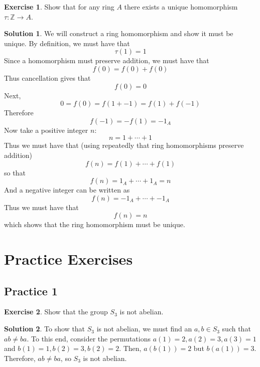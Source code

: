\documentclass[12pt]{article}
\theoremstyle{definition}
\newcommand{\Z}{\mathbb{Z}}
\newtheorem{exercise}{\color{YellowOrange}Exercise}
\theoremstyle{definition}
\newtheorem{solution}{\color{Goldenrod}Solution}
\begin{document}
\begin{exercise}
	Show that for any ring $A$ there exists a unique homomorphism $\tau : \Z \to A$. 
\end{exercise}
\begin{solution}
	We will construct a ring homomorphism and show it must be unique. By definition, we must have that
	\begin{equation}
		\tau(1) = 1
	\end{equation}
	Since a homomorphism must preserve addition, we must have that
	\begin{equation}
		f(0) = f(0) + f(0)
	\end{equation}
	Thus cancellation gives that
	\begin{equation}
		f(0) = 0
	\end{equation}
	Next,
	\begin{equation}
		0 = f(0) = f(1 + -1) = f(1) + f(-1)
	\end{equation}
	Therefore
	\begin{equation}
		f(-1) = -f(1) = -1_A
	\end{equation}
	Now take a positive integer $n$:
	\begin{equation}
		n = 1 + \cdots + 1
	\end{equation}
	Thus we must have that (using repeatedly that ring homomorphisms preserve addition)
	\begin{equation}
		f(n) = f(1) + \cdots + f(1)
	\end{equation}
	so that
	\begin{equation}
		f(n) = 1_A + \cdots + 1_A = n
	\end{equation}
	And a negative integer can be written as 
	\begin{equation}
		f(n) = -1_A + \cdots + -1_A
	\end{equation}
	Thus we must have that
	\begin{equation}
		f(n) = n
	\end{equation}
	which shows that the ring homomorphism must be unique. 
\end{solution}


\section{Practice Exercises}
\subsection{Practice 1}
\begin{exercise}
Show that the group $S_3$ is not abelian. 
\end{exercise}
\begin{solution}
To show that $S_3$ is not abelian, we must find an $a,b \in S_3$ such that $ab \neq ba$. To this end, consider the permutations $a(1) = 2, a(2) = 3, a(3) = 1$ and $b(1) = 1, b(2) = 3, b(2) = 2.$ Then, $a(b(1))= 2$ but $b(a(1)) = 3$. Therefore, $ab \neq ba$, so $S_3$ is not abelian.
\end{solution}
\end{document}
